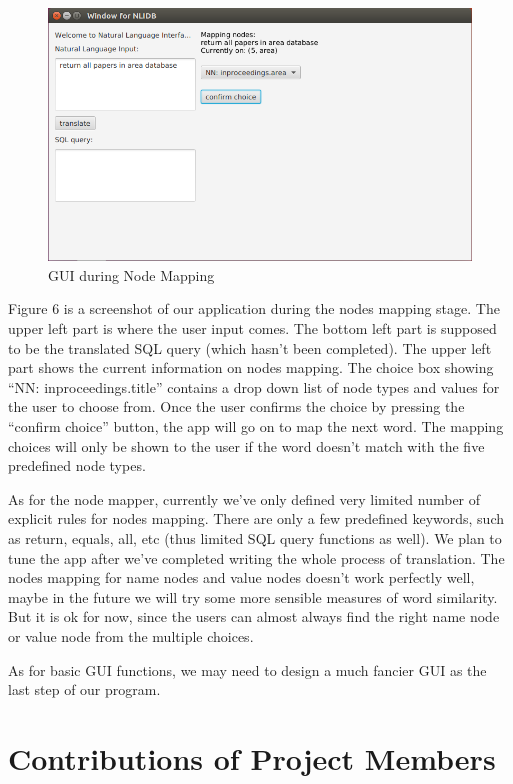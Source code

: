 \documentclass[twocolumn]{article}
\begin{document}
\begin{figure}[ht]
  \centering
  \includegraphics[width=0.7\linewidth]{figures/gui_nodes_mapping.png}
  \caption{GUI during Node Mapping}
\end{figure}

Figure 6 is a screenshot of our application during the nodes mapping stage. The upper left part is where the user input comes. The bottom left part is supposed to be the translated SQL query (which hasn’t been completed). The upper left part shows the current information on nodes mapping. The choice box showing “NN: inproceedings.title” contains a drop down list of node types and values for the user to choose from. Once the user confirms the choice by pressing the “confirm choice” button, the app will go on to map the next word. The mapping choices will only be shown to the user if the word doesn’t match with the five predefined node types.

As for the node mapper, currently we’ve only defined very limited number of explicit rules for nodes mapping. There are only a few predefined keywords, such as return, equals, all, etc (thus limited SQL query functions as well). We plan to tune the app after we’ve completed writing the whole process of translation. The nodes mapping for name nodes and value nodes doesn’t work perfectly well, maybe in the future we will try some more sensible measures of word similarity. But it is ok for now, since the users can almost always find the right name node or value node from the multiple choices. 

As for basic GUI functions, we may need to design a much fancier GUI as the last step of our program.

\section{Contributions of Project Members}
\end{document}
